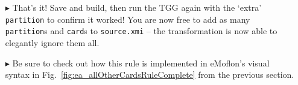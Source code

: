 \begin{itemize}
\item[$\blacktriangleright$] That's it! Save and build, then run the TGG again with the `extra' \texttt{partition} to confirm it worked!
You are now free to add as many \texttt{partition}s and \texttt{card}s to \texttt{source.xmi} -- the transformation is now able to elegantly ignore them all.

\vspace{0.5cm}

\item[$\blacktriangleright$] Be sure to check out how this rule is implemented in eMoflon's visual syntax in Fig.~\ref{fig:ea_allOtherCardsRuleComplete} from
the previous section.

\end{itemize}
